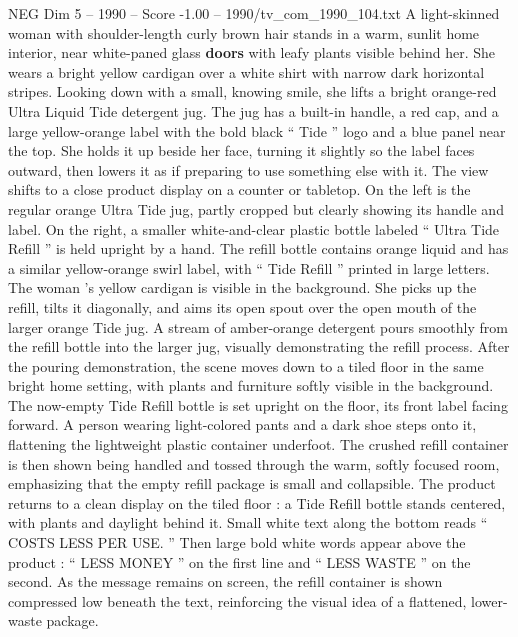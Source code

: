 \begin{textsample}{NEG Dim 5 – 1990 – Score -1.00 – 1990/tv\_com\_1990\_104.txt}  \label{ex:f5_neg_083}
A light-skinned woman with shoulder-length curly brown hair stands in a warm, sunlit home interior, near white-paned glass \textbf{doors} with leafy plants visible behind her.
She wears a bright yellow cardigan over a white shirt with narrow dark horizontal stripes.
Looking down with a small, knowing smile, she lifts a bright orange-red Ultra Liquid Tide detergent jug.
The jug has a built-in handle, a red cap, and a large yellow-orange label with the bold black “ Tide ” logo and a blue panel near the top.
She holds it up beside her face, turning it slightly so the label faces outward, then lowers it as if preparing to use something else with it.
The view shifts to a close product display on a counter or tabletop.
On the left is the regular orange Ultra Tide jug, partly cropped but clearly showing its handle and label.
On the right, a smaller white-and-clear plastic bottle labeled “ Ultra Tide Refill ” is held upright by a hand.
The refill bottle contains orange liquid and has a similar yellow-orange swirl label, with “ Tide Refill ” printed in large letters.
The woman ’s yellow cardigan is visible in the background.
She picks up the refill, tilts it diagonally, and aims its open spout over the open mouth of the larger orange Tide jug.
A stream of amber-orange detergent pours smoothly from the refill bottle into the larger jug, visually demonstrating the refill process.
After the pouring demonstration, the scene moves down to a tiled floor in the same bright home setting, with plants and furniture softly visible in the background.
The now-empty Tide Refill bottle is set upright on the floor, its front label facing forward.
A person wearing light-colored pants and a dark shoe steps onto it, flattening the lightweight plastic container underfoot.
The crushed refill container is then shown being handled and tossed through the warm, softly focused room, emphasizing that the empty refill package is small and collapsible.
The product returns to a clean display on the tiled floor : a Tide Refill bottle stands centered, with plants and daylight behind it.
Small white text along the bottom reads “ COSTS LESS PER USE. ” Then large bold white words appear above the product : “ LESS MONEY ” on the first line and “ LESS WASTE ” on the second.
As the message remains on screen, the refill container is shown compressed low beneath the text, reinforcing the visual idea of a flattened, lower-waste package.

\end{textsample}
